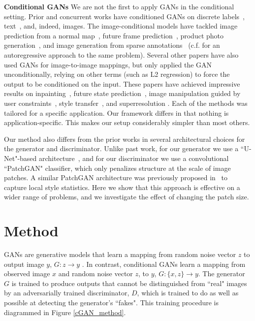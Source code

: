 \documentclass[10pt,twocolumn,letterpaper]{article}
\begin{document}
{\bf Conditional GANs}
We are not the first to apply GANs in the conditional setting. Prior and concurrent works have conditioned GANs on discrete labels~\cite{mirza2014conditional,gauthier2014conditional,denton2015deep}, text~\cite{reed2016generative}, and, indeed, images. The image-conditional models have tackled image prediction from a normal map~\cite{wang2016generative}, future frame prediction~\cite{mathieu2015deep}, product photo generation~\cite{yoo2016pixel}, and image generation from sparse annotations~\cite{karacan2016learning,reed2016learning} (c.f. \cite{reed2016generating} for an autoregressive approach to the same problem). Several other papers have also used GANs for image-to-image mappings, but only applied the GAN unconditionally, relying on other terms (such as L2 regression) to force the output to be conditioned on the input. These papers have achieved impressive results on inpainting~\cite{pathak2016context}, future state prediction~\cite{zhou2016learning}, image manipulation guided by user constraints~\cite{zhu2016generative}, style transfer~\cite{li2016precomputed}, and superresolution \cite{ledig2016photo}. Each of the methods was tailored for a specific application. Our framework differs in that nothing is application-specific. This makes our setup considerably simpler than most others.

Our method also differs from the prior works in several architectural choices for the generator and discriminator. Unlike past work, for our generator we use a ``U-Net"-based architecture~\cite{ronneberger2015u}, and for our discriminator we use a convolutional ``PatchGAN" classifier, which only penalizes structure at the scale of image patches. A similar PatchGAN architecture was previously proposed in~\cite{li2016precomputed} to capture local style statistics. Here we show that this approach is effective on a wider range of problems, and we investigate the effect of changing the patch size.




\section{Method}

GANs are generative models that learn a mapping from random noise vector $z$ to output image $y$, $G: z\rightarrow y$ \cite{goodfellow2014generative}. In contrast, conditional GANs learn a mapping from observed image $x$ and random noise vector $z$, to $y$, $G: \{x,z\}\rightarrow y$. The generator $G$ is trained to produce outputs that cannot be distinguished from ``real" images by an adversarially trained discriminator, $D$, which is trained to do as well as possible at detecting the generator's ``fakes". This training procedure is diagrammed in Figure \ref{cGAN_method}.
\end{document}
